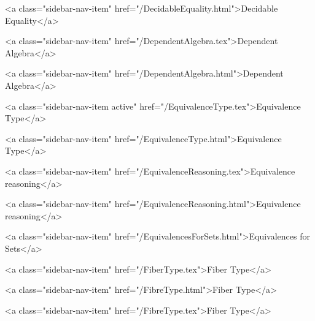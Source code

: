       
    
      
        
          <a class="sidebar-nav-item" href="/DecidableEquality.html">Decidable Equality</a>
        
      
    
      
        
          <a class="sidebar-nav-item" href="/DependentAlgebra.tex">Dependent Algebra</a>
        
      
    
      
        
          <a class="sidebar-nav-item" href="/DependentAlgebra.html">Dependent Algebra</a>
        
      
    
      
        
          <a class="sidebar-nav-item active" href="/EquivalenceType.tex">Equivalence Type</a>
        
      
    
      
        
          <a class="sidebar-nav-item" href="/EquivalenceType.html">Equivalence Type</a>
        
      
    
      
        
          <a class="sidebar-nav-item" href="/EquivalenceReasoning.tex">Equivalence reasoning</a>
        
      
    
      
        
          <a class="sidebar-nav-item" href="/EquivalenceReasoning.html">Equivalence reasoning</a>
        
      
    
      
        
          <a class="sidebar-nav-item" href="/EquivalencesForSets.html">Equivalences for Sets</a>
        
      
    
      
        
          <a class="sidebar-nav-item" href="/FiberType.tex">Fiber Type</a>
        
      
    
      
        
          <a class="sidebar-nav-item" href="/FibreType.html">Fiber Type</a>
        
      
    
      
        
          <a class="sidebar-nav-item" href="/FibreType.tex">Fiber Type</a>
        
